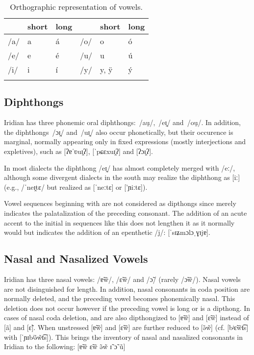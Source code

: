 \begin{table}
	\small
	\caption{Orthographic representation of vowels.}
	\medskip
	\begin{tabularx}{0.7\textwidth}{YMMYMM}
		\toprule
		& {\sc short} & {\sc long} & & {\sc short} & {\sc long}\\
		\midrule
		/a/ & a &\'a & /o/ & o &\'o \\
		/e/ & e &\'e & /u/ & u &\'u\\
		/i/ & i &\'i & /y/ & y, \"y &\'y\\
		\bottomrule
		\label{table:vowels-orth}
	\end{tabularx}
\end{table}

\subsection{Diphthongs}
Iridian has three phonemic oral diphthongs: \,/au̯/, \,/eɪ̯/ and \,/ou̯/. In addition, the diphthongs \,/ɔɪ̯/ and \,/uɪ̯/  also occur phonetically, but their occurence is marginal, normally appearing only in fixed expressions (mostly interjections and expletives), such as  [ʔɐˈʋuɪ̯ʔ],  [ˈpɕɛxuɪ̯ʔ] and  [ʔɔɪ̯ʔ].

In most dialects the diphthong /eɪ̯/ has almost completely merged with  /eː/, although some divergent dialects in the south may realize the diphthong as [iː] (e.g.,  /ˈneɪ̯tɛ/ but realized as [ˈneːtɛ] or ['ɲiːtɛ]).

Vowel sequences beginning with  are not considered as dipthongs since  merely indicates the palatalization of the preceding consonant. The addition of an acute accent to the initial  in sequences like this does not lengthen it as it normally would but indicates the addition of an epenthetic /j/:  [ˈsɪʑmɔlɔˌɣɪjɐ].

\subsection{Nasal and Nasalized Vowels}

Iridian has three nasal vowels:  /ɐ̃w̃/,  /ɛ̃w̃/ and  /ɔ̃/ (rarely /ɔ̃w̃/). Nasal vowels are not disinguished for length. In addition, nasal consonants in coda position are normally deleted, and the preceding vowel becomes phonemically nasal. This deletion does not occur however if the preceding vowel is long or is a dipthong. In cases of nasal coda deletion,  and  are also dipthongized to [ɐ̃w̃] and [ɛ̃w̃] instead of [\~a] and [ɛ̃]. When unstressed [ɐ̃w̃] and [ɛ̃w̃] are further reduced to [ə̃w̃] (cf.  [bʲɛ̃w̃t͡s] with  [ˈɲɪbʲə̃w̃t͡s]). This brings the inventory of nasal and nasalized consonants in Iridian to the following: [ɐ̃w̃ ɛ̃w̃ ə̃w̃ ɪ̃ ɔ̃ ũ]

